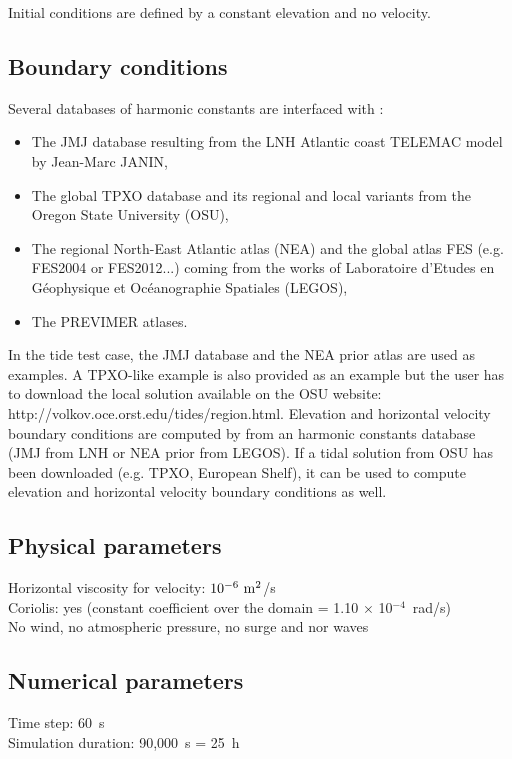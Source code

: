 Initial conditions are defined by a constant elevation and no velocity.

\subsection{Boundary conditions}

Several databases of harmonic constants are interfaced with
:
\begin{itemize}
\item The JMJ database resulting from the LNH Atlantic coast TELEMAC
model by Jean-Marc JANIN,
\item The global TPXO database and its regional and local variants
from the Oregon State University (OSU),
\item The regional North-East Atlantic atlas (NEA) and the global
atlas FES (e.g. FES2004 or FES2012...) coming from the works of
Laboratoire d’Etudes en Géophysique et Océanographie Spatiales (LEGOS),
\item The PREVIMER atlases.
\end{itemize}

In the tide test case, the JMJ database and the NEA prior atlas are
used as examples.
A TPXO-like example is also provided as an example but the user has
to download the local solution available on the OSU website:
http://volkov.oce.orst.edu/tides/region.html.
Elevation and horizontal velocity boundary conditions are computed by
 from an harmonic constants database (JMJ from LNH or
NEA prior from LEGOS). If a tidal solution from OSU has been downloaded (e.g. TPXO, European
Shelf), it can be used to compute elevation and horizontal velocity
boundary conditions as well.

\subsection{Physical parameters}

Horizontal viscosity for velocity: $10^{-6}~\rm{m}^2$/s\\
Coriolis: yes (constant coefficient over the domain
= 1.10 $\times$ 10$^{-4}$~rad/s)\\
No wind, no atmospheric pressure, no surge and nor waves

\subsection{Numerical parameters}

Time step: 60~s\\
Simulation duration: 90,000~s = 25~h\\

